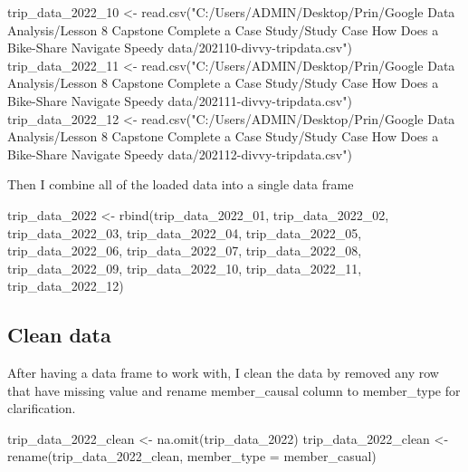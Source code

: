 \documentclass[
]{article}
\newenvironment{Shaded}{\begin{snugshade}}{\end{snugshade}}
\newcommand{\AttributeTok}[1]{\textcolor[rgb]{0.77,0.63,0.00}{#1}}
\newcommand{\FunctionTok}[1]{\textcolor[rgb]{0.00,0.00,0.00}{#1}}
\newcommand{\NormalTok}[1]{#1}
\newcommand{\OtherTok}[1]{\textcolor[rgb]{0.56,0.35,0.01}{#1}}
\newcommand{\StringTok}[1]{\textcolor[rgb]{0.31,0.60,0.02}{#1}}
\begin{document}
\begin{Shaded}
\begin{Highlighting}[]
\NormalTok{trip\_data\_2022\_10 }\OtherTok{\textless{}{-}} \FunctionTok{read.csv}\NormalTok{(}\StringTok{"C:/Users/ADMIN/Desktop/Prin/Google Data Analysis/Lesson 8 Capstone Complete a Case Study/Study Case How Does a Bike{-}Share Navigate Speedy data/202110{-}divvy{-}tripdata.csv"}\NormalTok{)}
\NormalTok{trip\_data\_2022\_11 }\OtherTok{\textless{}{-}} \FunctionTok{read.csv}\NormalTok{(}\StringTok{"C:/Users/ADMIN/Desktop/Prin/Google Data Analysis/Lesson 8 Capstone Complete a Case Study/Study Case How Does a Bike{-}Share Navigate Speedy data/202111{-}divvy{-}tripdata.csv"}\NormalTok{)}
\NormalTok{trip\_data\_2022\_12 }\OtherTok{\textless{}{-}} \FunctionTok{read.csv}\NormalTok{(}\StringTok{"C:/Users/ADMIN/Desktop/Prin/Google Data Analysis/Lesson 8 Capstone Complete a Case Study/Study Case How Does a Bike{-}Share Navigate Speedy data/202112{-}divvy{-}tripdata.csv"}\NormalTok{)}
\end{Highlighting}
\end{Shaded}

Then I combine all of the loaded data into a single data frame

\begin{Shaded}
\begin{Highlighting}[]
\NormalTok{trip\_data\_2022 }\OtherTok{\textless{}{-}} \FunctionTok{rbind}\NormalTok{(trip\_data\_2022\_01, trip\_data\_2022\_02, trip\_data\_2022\_03, trip\_data\_2022\_04, trip\_data\_2022\_05, trip\_data\_2022\_06, trip\_data\_2022\_07, trip\_data\_2022\_08, trip\_data\_2022\_09, trip\_data\_2022\_10, trip\_data\_2022\_11, trip\_data\_2022\_12)}
\end{Highlighting}
\end{Shaded}

\hypertarget{clean-data}{%
\subsection{Clean data}\label{clean-data}}

After having a data frame to work with, I clean the data by removed any
row that have missing value and rename member\_causal column to
member\_type for clarification.

\begin{Shaded}
\begin{Highlighting}[]
\NormalTok{trip\_data\_2022\_clean }\OtherTok{\textless{}{-}} \FunctionTok{na.omit}\NormalTok{(trip\_data\_2022)}
\NormalTok{trip\_data\_2022\_clean }\OtherTok{\textless{}{-}} \FunctionTok{rename}\NormalTok{(trip\_data\_2022\_clean, }\AttributeTok{member\_type =}\NormalTok{ member\_casual)}
\end{Highlighting}
\end{Shaded}
\end{document}
